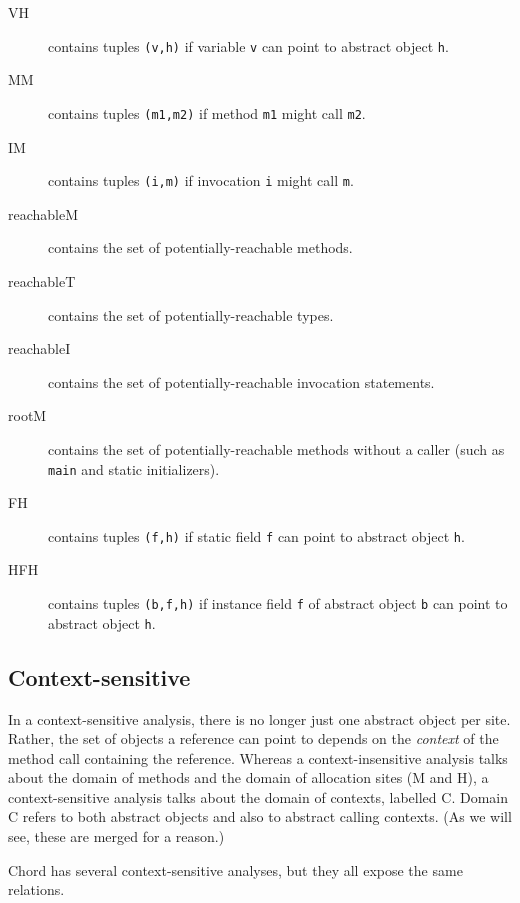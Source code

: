 \begin{description}
\item[VH] contains tuples \texttt{(v,h)} if variable \texttt{v} can point to abstract object \texttt{h}.
\item[MM] contains tuples \texttt{(m1,m2)} if method \texttt{m1} might call \texttt{m2}.
\item[IM] contains tuples \texttt{(i,m)} if invocation \texttt{i} might call \texttt{m}.
\item[reachableM] contains the set of potentially-reachable methods.
\item[reachableT] contains the set of potentially-reachable types.
\item[reachableI] contains the set of potentially-reachable invocation statements.
\item[rootM] contains the set of potentially-reachable methods without a caller (such as \texttt{main} and static initializers).
\item[FH] contains tuples \texttt{(f,h)} if static field \texttt{f} can point to abstract object \texttt{h}.
\item[HFH] contains tuples \texttt{(b,f,h)} if instance field \texttt{f} of abstract object \texttt{b} can point to abstract object \texttt{h}.
\end{description}

\subsection{Context-sensitive}

In a context-sensitive analysis, there is no longer just one abstract object per site.
Rather, the set of objects a reference can point to depends on the \textit{context} of
the method call containing the reference.
Whereas a context-insensitive analysis talks about the domain of methods and the domain
of allocation sites (M and H), a context-sensitive analysis talks about the domain of contexts, labelled C.
Domain C refers to both abstract objects and also to abstract calling contexts. (As we will see, these
are merged for a reason.)

Chord has several context-sensitive analyses, but they all expose the same relations.

